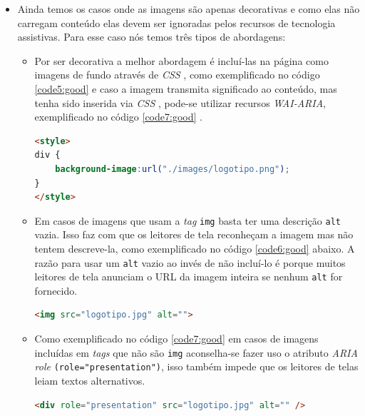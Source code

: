 {\begin{itemize}
\item  Ainda temos os casos onde as imagens são apenas decorativas e como elas não carregam conteúdo elas devem ser ignoradas pelos recursos de tecnologia assistivas. Para esse caso nós temos três tipos de abordagens: 
\begin{itemize}
\item Por ser decorativa a melhor abordagem é incluí-las na página como imagens de fundo através de \textit{CSS} \cite{CSS}, como exemplificado no código \ref{code5:good} e caso a imagem transmita significado ao conteúdo, mas tenha sido inserida via \textit{CSS} \cite{CSS}, pode-se utilizar recursos \textit{WAI-ARIA}\cite{WAI-ARIA}, exemplificado no código \ref{code7:good} .
{\begin{lstlisting}[language=html,caption={Adição de imagens via CSS.}, label=code5:good]
<style>
div {
    background-image:url("./images/logotipo.png");
}
</style>
\end{lstlisting}}
\item Em casos de imagens que usam a \textit{tag} \lstinline{img} basta ter uma descrição \lstinline{alt} vazia. Isso faz com que os leitores de tela reconheçam a imagem mas não tentem descreve-la, como exemplificado no código \ref{code6:good} abaixo. A razão para usar um \lstinline{alt} vazio ao invés de não incluí-lo é porque muitos leitores de tela anunciam o URL da imagem inteira se nenhum \lstinline{alt} for fornecido.
{\begin{lstlisting}[language=html,caption={Uso do atributo \lstinline{alt} vazio.}, label=code6:good]
<img src="logotipo.jpg" alt=""> 
\end{lstlisting}}

\item Como exemplificado no código \ref{code7:good} em casos de imagens incluídas em \textit{tags} que não são \lstinline{img} aconselha-se fazer uso o atributo \textit{ARIA role} \cite{WAI-ARIA} \lstinline{(role="presentation")}, isso também impede que os leitores de telas leiam textos alternativos. 
{\begin{lstlisting}[language=html,caption={Uso atributo WAI-ARIA \cite{WAI-ARIA} role="presentation".}, label=code7:good]
<div role="presentation" src="logotipo.jpg" alt="" />
\end{lstlisting}}
\end{itemize}


 
\end{itemize}}

